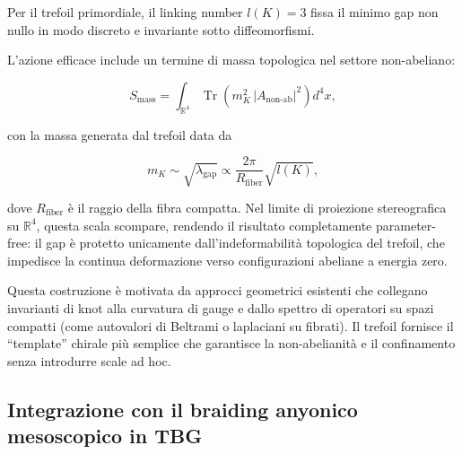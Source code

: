\documentclass[11pt,a4paper]{article}
\theoremstyle{plain}
\theoremstyle{definition}
\begin{document}
\vspace{0.3cm}




\vspace{0.2cm}

Per il trefoil primordiale, il linking number \(l(K) = 3\) fissa il minimo gap non nullo in modo discreto e invariante sotto diffeomorfismi.

\vspace{0.5cm}

L'azione efficace include un termine di massa topologica nel settore non-abeliano:

\begin{equation}
S_{\text{mass}} = \int_{\mathbb{R}^4} \operatorname{Tr} \left( m_K^2 \, |A_{\text{non-ab}}|^2 \right) d^4x,
\label{eq:mass_term}
\end{equation}

\vspace{0.2cm}

con la massa generata dal trefoil data da

\begin{equation}
m_K \sim \sqrt{\lambda_{\text{gap}}} \propto \frac{2\pi}{R_{\text{fiber}}} \sqrt{l(K)},
\label{eq:m_K}
\end{equation}

\vspace{0.2cm}

dove \(R_{\text{fiber}}\) è il raggio della fibra compatta. Nel limite di proiezione stereografica su \(\mathbb{R}^4\), questa scala scompare, rendendo il risultato completamente parameter-free: il gap è protetto unicamente dall'indeformabilità topologica del trefoil, che impedisce la continua deformazione verso configurazioni abeliane a energia zero.


\vspace{0.3cm}

Questa costruzione è motivata da approcci geometrici esistenti che collegano invarianti di knot alla curvatura di gauge e dallo spettro di operatori su spazi compatti (come autovalori di Beltrami o laplaciani su fibrati). Il trefoil fornisce il ``template'' chirale più semplice che garantisce la non-abelianità e il confinamento senza introdurre scale ad hoc.



\vspace{0.5cm}

\subsection{Integrazione con il braiding anyonico mesoscopico in TBG}
\end{document}
